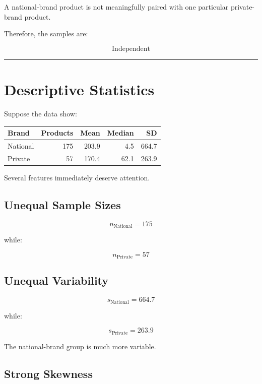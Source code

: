 \documentclass[
  letterpaper,
  DIV=11,
  numbers=noendperiod]{scrreprt}
\newcounter{none} %
\begin{document}
A national-brand product is not meaningfully paired with one particular
private-brand product.

Therefore, the samples are:

\[
\boxed{\text{Independent}}
\]

\begin{center}\rule{0.5\linewidth}{0.5pt}\end{center}

\section{Descriptive Statistics}\label{descriptive-statistics}

Suppose the data show:

{\def\LTcaptype{none} %
\begin{longtable}[]{@{}lrrrr@{}}
\toprule\noalign{}
Brand & Products & Mean & Median & SD \\
\midrule\noalign{}
\endhead
\bottomrule\noalign{}
\endlastfoot
National & 175 & 203.9 & 4.5 & 664.7 \\
Private & 57 & 170.4 & 62.1 & 263.9 \\
\end{longtable}
}

Several features immediately deserve attention.

\subsection{Unequal Sample Sizes}\label{unequal-sample-sizes}

\[
n_{\text{National}}=175
\]

while:

\[
n_{\text{Private}}=57
\]

\subsection{Unequal Variability}\label{unequal-variability}

\[
s_{\text{National}}=664.7
\]

while:

\[
s_{\text{Private}}=263.9
\]

The national-brand group is much more variable.

\subsection{Strong Skewness}\label{strong-skewness}
\end{document}
